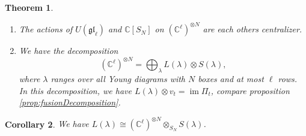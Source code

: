 \documentclass[11pt]{report}
\newtheorem{theorem}{Theorem}[section]
\newtheorem{corollary}[theorem]{Corollary}
\theoremstyle{definition}
\theoremstyle{remark}
\theoremstyle{remark}
\newcommand{\C}{\mathbb{C}}
\begin{document}
\begin{theorem}
\begin{enumerate}[label=(\roman*)]
\item The actions of $U(\mathfrak{gl}_\ell)$ and $\C[S_N]$ on $(\C^\ell)^{\otimes N}$ are each others centralizer.
\item We have the decomposition
\begin{equation*}
(\C^\ell)^{\otimes N} = \bigoplus_{\lambda} L(\lambda) \otimes S(\lambda),
\end{equation*}
where $\lambda$ ranges over all Young diagrams with $N$ boxes and at most $\ell$ rows. In this decomposition, we have $L(\lambda) \otimes v_t = \operatorname{im} \Pi_t$, compare proposition \ref{prop:fusionDecomposition}.
\end{enumerate}
\end{theorem}

\begin{corollary}\label{corollary:SchurWeyl}
We have $L(\lambda) \cong (\C^\ell)^{\otimes N} \otimes_{S_N} S(\lambda)$.
\end{corollary}
\end{document}
